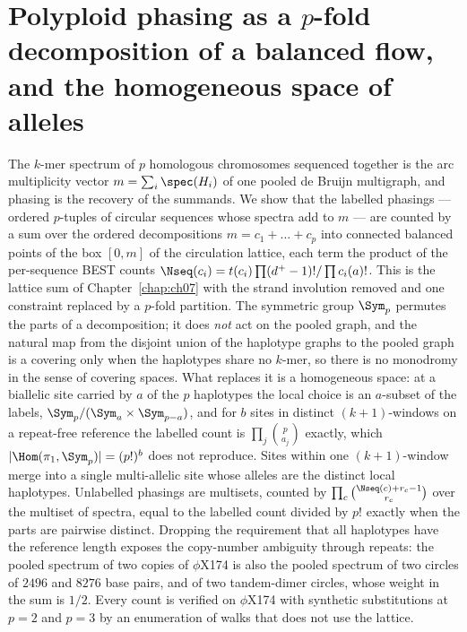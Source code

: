 \chapter[Polyploid phasing]{\texorpdfstring{Polyploid phasing as a $p$-fold decomposition of a balanced flow, and the homogeneous space of alleles}{Polyploid phasing as a p-fold decomposition of a balanced flow, and the homogeneous space of alleles}}\label{chap:ch13}
\begin{chaptersummary}
The $k$-mer spectrum of $p$ homologous chromosomes sequenced together is the arc
multiplicity vector $m=\sum_i\spec(H_i)$ of one pooled de Bruijn multigraph, and phasing is
the recovery of the summands. We show that the labelled phasings --- ordered $p$-tuples of
circular sequences whose spectra add to $m$ --- are counted by a sum over the ordered
decompositions $m=c_1+\dots+c_p$ into connected balanced points of the box $[0,m]$ of the
circulation lattice, each term the product of the per-sequence BEST counts
$\Nseq(c_i)=t(c_i)\prod(d^+-1)!/\prod c_i(a)!$. This is the lattice sum of
Chapter~\ref{chap:ch07} with the strand involution removed and one constraint replaced by a $p$-fold partition.
The symmetric group $\Sym_p$ permutes the parts of a decomposition; it does \emph{not} act on
the pooled graph, and the natural map from the disjoint union of the haplotype graphs to the
pooled graph is a covering only when the haplotypes share no $k$-mer, so there is no
monodromy in the sense of covering spaces. What replaces it is a homogeneous space: at a
biallelic site carried by $a$ of the $p$ haplotypes the local choice is an $a$-subset of the
labels, $\Sym_p/(\Sym_a\times\Sym_{p-a})$, and for $b$ sites in distinct $(k{+}1)$-windows on a
repeat-free reference the labelled count is $\prod_j\binom{p}{a_j}$ exactly, which
$|\Hom(\pi_1,\Sym_p)|=(p!)^b$ does not reproduce. Sites within one $(k{+}1)$-window merge into
a single multi-allelic site whose alleles are the distinct local haplotypes. Unlabelled
phasings are multisets, counted by $\prod_c\binom{\Nseq(c)+r_c-1}{r_c}$ over the multiset of
spectra, equal to the labelled count divided by $p!$ exactly when the parts are pairwise
distinct. Dropping the requirement that all haplotypes have the reference length exposes the
copy-number ambiguity through repeats: the pooled spectrum of two copies of $\phi$X174 is also
the pooled spectrum of two circles of $2496$ and $8276$ base pairs, and of two tandem-dimer
circles, whose weight in the sum is $1/2$. Every count is verified on $\phi$X174 with synthetic
substitutions at $p=2$ and $p=3$ by an enumeration of walks that does not use the lattice.
\end{chaptersummary}

